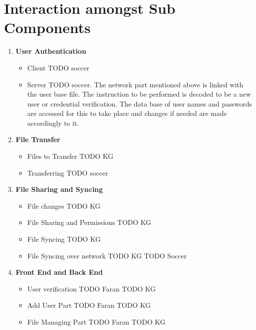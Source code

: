 \documentclass{article}
\begin{document}
	\section{Interaction amongst Sub Components}
		\begin{enumerate}
			\item \textbf{User Authentication}
				\begin{itemize}
					\item Client
						TODO soccer
					\item Server
						TODO soccer.
						\newline
						The network part mentioned above is linked with the user base file. The instruction to be performed is decoded to be a new user or credential verification. The data base of user names and passwords are accessed for this to take place and changes if needed are made accordingly to it.
				\end{itemize}
			\item \textbf{File Transfer}
				\begin{itemize}
					\item Files to Transfer
						TODO KG
					\item Transferring
						TODO soccer
				\end{itemize}	
			\item \textbf{File Sharing and Syncing}
				\begin{itemize}
					\item File changes
						TODO KG
					\item File Sharing and Permissions
						TODO KG
					\item File Syncing
						TODO KG
					\item File Syncing over network
						TODO KG
						TODO Soccer
				\end{itemize}
			\item \textbf{Front End and Back End}
				\begin{itemize}
					\item User verification
						TODO Faran
						TODO KG
					\item Add User Part
						TODO Faran
						TODO KG
					\item File Managing Part
						TODO Faran
						TODO KG			
				\end{itemize}
		\end{enumerate}
\end{document}
